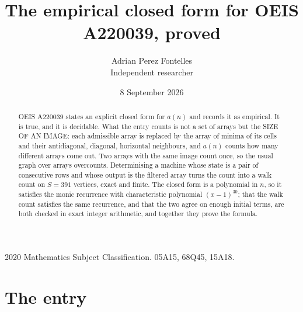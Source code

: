 \documentclass[11pt,a4paper]{article}
\title{The empirical closed form for OEIS A220039, proved}
\author{Adrian Perez Fontelles\\ \small Independent researcher}
\date{8 September 2026}
\theoremstyle{plain}
\theoremstyle{definition}
\begin{document}
\maketitle

\begin{abstract}
OEIS A220039 states an explicit closed form for $a(n)$ and records it as empirical. It is true, and
it is decidable. What the entry counts is not a set of arrays but the SIZE OF AN IMAGE: each
admissible array is replaced by the array of minima of its cells and their antidiagonal, diagonal, horizontal neighbours,
and $a(n)$ counts how many different arrays come out. Two arrays with the same image count
once, so the usual graph over arrays overcounts. Determinising a machine whose state is a pair
of consecutive rows and whose output is the filtered array turns the count into a walk count on
$S=391$ vertices, exact and finite. The closed form is a polynomial in $n$, so it satisfies the
monic recurrence with characteristic polynomial $(x-1)^{30}$; that the walk count
satisfies the same recurrence, and that the two agree on enough initial terms, are both checked
in exact integer arithmetic, and together they prove the formula.
\end{abstract}

\noindent\small 2020 Mathematics Subject Classification. 05A15, 68Q45, 15A18.\normalsize

\section{The entry}
\end{document}
